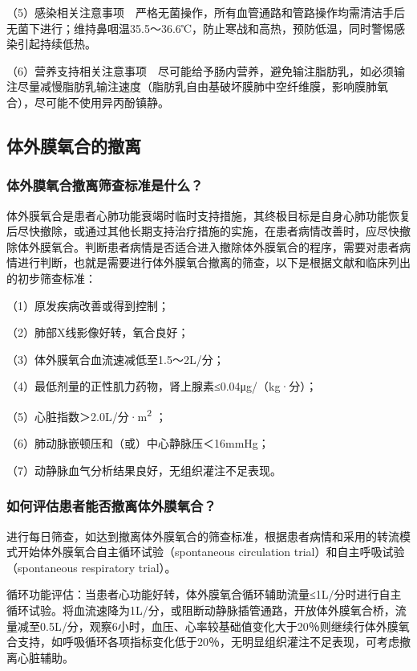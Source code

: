 （5）感染相关注意事项　严格无菌操作，所有血管通路和管路操作均需清洁手后无菌下进行；维持鼻咽温35.5～36.6℃，防止寒战和高热，预防低温，同时警惕感染引起持续低热。

（6）营养支持相关注意事项　尽可能给予肠内营养，避免输注脂肪乳，如必须输注尽量减慢脂肪乳输注速度（脂肪乳自由基破坏膜肺中空纤维膜，影响膜肺氧合），尽可能不使用异丙酚镇静。

\subsection{体外膜氧合的撤离}

\subsubsection{体外膜氧合撤离筛查标准是什么？}

体外膜氧合是患者心肺功能衰竭时临时支持措施，其终极目标是自身心肺功能恢复后尽快撤除，或通过其他长期支持治疗措施的实施，在患者病情改善时，应尽快撤除体外膜氧合。判断患者病情是否适合进入撤除体外膜氧合的程序，需要对患者病情进行判断，也就是需要进行体外膜氧合撤离的筛查，以下是根据文献和临床列出的初步筛查标准：

（1）原发疾病改善或得到控制；

（2）肺部X线影像好转，氧合良好；

（3）体外膜氧合血流速减低至1.5～2L/分；

（4）最低剂量的正性肌力药物，肾上腺素≤0.04μg/（kg·分）；

（5）心脏指数＞2.0L/分·m\textsuperscript{2} ；

（6）肺动脉嵌顿压和（或）中心静脉压＜16mmHg；

（7）动静脉血气分析结果良好，无组织灌注不足表现。

\subsubsection{如何评估患者能否撤离体外膜氧合？}

进行每日筛查，如达到撤离体外膜氧合的筛查标准，根据患者病情和采用的转流模式开始体外膜氧合自主循环试验（spontaneous
circulation trial）和自主呼吸试验（spontaneous respiratory trial）。

循环功能评估：当患者心功能好转，体外膜氧合循环辅助流量≤1L/分时进行自主循环试验。将血流速降为1L/分，或阻断动静脉插管通路，开放体外膜氧合桥，流量减至0.5L/分，观察6小时，血压、心率较基础值变化大于20％则继续行体外膜氧合支持，如呼吸循环各项指标变化低于20％，无明显组织灌注不足表现，可考虑撤离心脏辅助。


